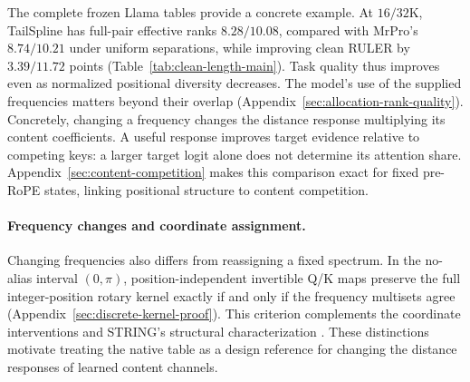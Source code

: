 The complete frozen Llama tables provide a concrete example. At $16/32$K,
TailSpline has full-pair effective ranks $8.28/10.08$, compared with
MrPro's $8.74/10.21$ under uniform separations, while improving clean
RULER by $3.39/11.72$ points (Table~\ref{tab:clean-length-main}).
Task quality thus improves even as normalized positional diversity decreases.
The model's use of the supplied frequencies matters beyond their overlap
(Appendix~\ref{sec:allocation-rank-quality}).
Concretely, changing a frequency changes the distance response multiplying
its content coefficients. A useful response improves target evidence relative
to competing keys: a larger target logit alone does not determine its attention
share. Appendix~\ref{sec:content-competition} makes this comparison exact for
fixed pre-RoPE states, linking positional structure to content competition.

\paragraph{Frequency changes and coordinate assignment.}
Changing frequencies also differs from reassigning a fixed spectrum.
In the no-alias interval $(0,\pi)$, position-independent invertible Q/K
maps preserve the full integer-position rotary kernel exactly if and only
if the frequency multisets agree (Appendix~\ref{sec:discrete-kernel-proof}).
This criterion complements the coordinate interventions and STRING's
structural characterization \citep{schenck2025string}.
These distinctions motivate treating the native table as a design reference
for changing the distance responses of learned content channels.
